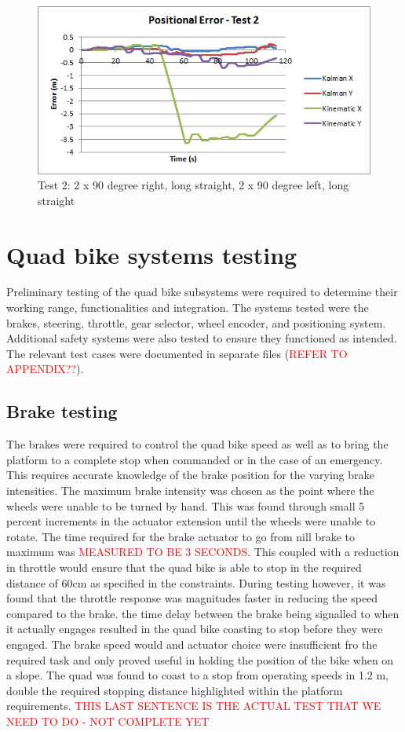 \documentclass[main.tex]{subfiles}
\begin{document}
\begin{figure}[ht]
\includegraphics[width=\textwidth]{5-Testing/position_error_test_2.png}
\centering
\caption{Test 2: 2 x 90 degree right, long straight, 2 x 90 degree left, long straight} 
\end{figure}

\section{Quad bike systems testing}
Preliminary testing of the quad bike subsystems were required to determine their working range, functionalities and integration. The systems tested were the brakes, steering, throttle, gear selector, wheel encoder, and positioning system. Additional safety systems were also tested to ensure they functioned as intended.
The relevant test cases were documented in separate files (\textcolor{red}{REFER TO APPENDIX??}).

\subsection{Brake testing}
The brakes were required to control the quad bike speed as well as to bring the platform to a complete stop when commanded or in the case of an emergency. This requires accurate knowledge of the brake position for the varying brake intensities. The maximum brake intensity was chosen as the point where the wheels were unable to be turned by hand. This was found through small 5 percent increments in the actuator extension until the wheels were unable to rotate. The time required for the brake actuator to go from nill brake to maximum was \textcolor{red}{MEASURED TO BE 3 SECONDS}. This coupled with a reduction in throttle would ensure that the quad bike is able to stop in the required distance of 60cm as specified in the constraints. During testing however, it was found that the throttle response was magnitudes faster in reducing the speed compared to the brake. the time delay between the brake being signalled to when it actually engages resulted  in the quad bike coasting to stop before they were engaged. The brake speed would and actuator choice were insufficient fro the required task and only proved useful in holding the position of the bike when on a slope. The quad was found to coast to a stop from operating speeds in 1.2 m, double the required stopping distance highlighted within the platform requirements.    \textcolor{red}{THIS LAST SENTENCE IS THE ACTUAL TEST THAT WE NEED TO DO - NOT COMPLETE YET}
\end{document}
